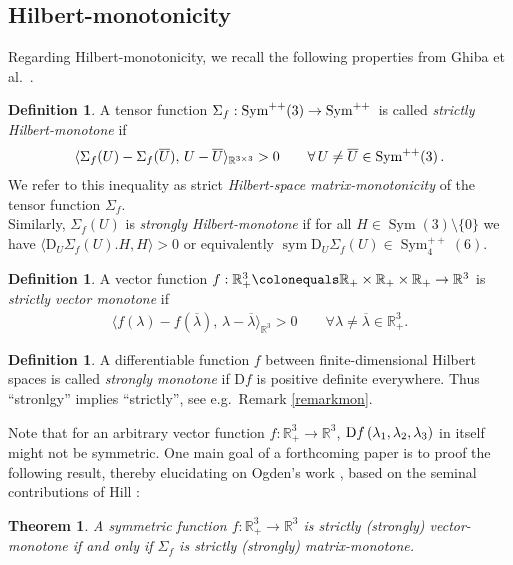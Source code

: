 \documentclass[10pt]{article}
\newcounter{theoremCounter}
\numberwithin{theoremCounter}{section}
\theoremstyle{plain}
\newtheorem{thm}[theoremCounter]{Theorem}
\theoremstyle{definition}
\newtheorem{definition}[theoremCounter]{Definition}
\newcommand{\R}{\mathbb{R}}
\newcommand{\DD}{\mathrm{D}}
\newcommand{\innerproduct}[1]{\langle #1 \rangle}
\newcommand{\iprod}{\innerproduct}
\DeclareMathOperator{\Sym}{Sym}
\DeclareMathOperator{\sym}{sym}
\numberwithin{equation}{section}
\begin{document}
\begin{appendix}
\subsection{Hilbert-monotonicity }\label{ips2}
%
Regarding Hilbert-monotonicity, we recall the following properties from Ghiba et al.~\cite{ghiba2024}.
%
\begin{definition} \cite{NeffMartin14}
A tensor function $\Sigma_f:{\rm Sym}^{++}(3)\to\Sym^{++}\,$ is called  \emph{strictly Hilbert-monotone} if
	\begin{align}
	\label{eq:introductionMatrixMonotonicity}
	\iprod{\Sigma_f(U)-\Sigma_f(\overline U),\,U-\overline U}_{\R^{3\times 3}}>0\qquad\forall\,U\neq\overline U\in{\rm Sym}^{++}(3)\,.
	\end{align}
We refer to this inequality as strict \emph{Hilbert-space matrix-monotonicity} of the tensor function $\Sigma_f$. \\
%
Similarly, $\Sigma_f(U)$ is \emph{strongly Hilbert-monotone} if for all $H \in \Sym(3) \! \setminus \! \{0\}$ we have $\langle \DD_U \Sigma_f(U).H, H \rangle > 0$ or equivalently $\sym \DD_U \Sigma_f(U) \in \Sym^{++}_4(6)$.
\end{definition}
%
\begin{definition}\cite{NeffMartin14}
A vector function  $f:\R^3_+ \colonequals \R_+ \times \R_+ \times \R_+ \to\R^3$ is \emph{strictly vector monotone} if 
	\begin{align}
	\iprod{f(\lambda)-f(\overline\lambda),\,\lambda-\overline\lambda}_{\R^3}>0\qquad\forall\lambda\neq\overline\lambda\in\R^3_+.
	\end{align}
\end{definition}
%
\begin{definition}
A differentiable function $f$ between finite-dimensional Hilbert spaces is called \emph{strongly monotone} if $\DD f$ is positive definite everywhere. Thus ``stronlgy'' implies ``strictly'', see e.g.~Remark \ref{remarkmon}.
\end{definition}
%
\noindent Note that for an arbitrary vector function $f: \R^3_+ \to \R^3$, ${\rm D}f\,(\lambda_1,\lambda_2,\lambda_3)$ in itself might not be symmetric. One main goal of a forthcoming paper \cite{MartinVossGhibaNeff}  is to proof the following result, thereby elucidating on Ogden's work \cite[last page in Appendix]{Ogden83}, based on the seminal contributions of Hill \cite{hill1968constitutivea,hill1968constitutiveb,hill1970constitutive}: 
\begin{thm}
	\label{theorem:mainResult}
	A symmetric function $f:\R^3_+\to\R^3$ is strictly (strongly) vector-monotone if and only if $\Sigma_f$ is strictly (strongly) matrix-monotone.

\end{thm}
\end{appendix}
\end{document}
